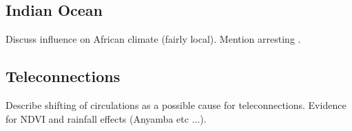 
\subsection{Indian Ocean}
Discuss influence on African climate (fairly local). Mention arresting .

\subsection{Teleconnections}
Describe shifting of circulations as a possible cause for
teleconnections. Evidence for NDVI and rainfall effects (Anyamba etc ...).

